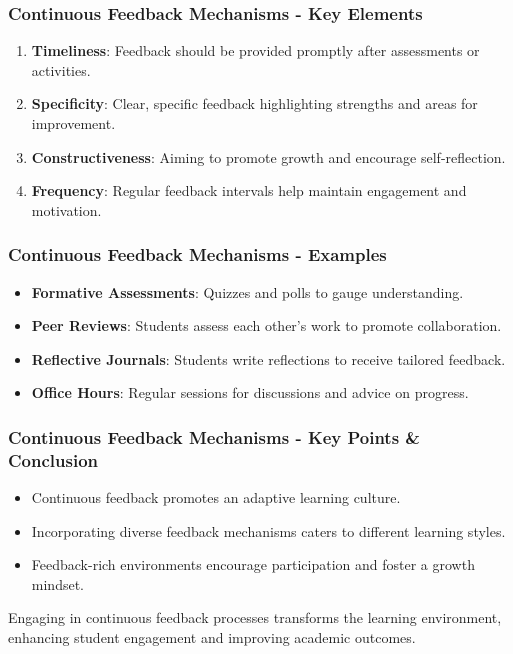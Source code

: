 \documentclass[aspectratio=169]{beamer}
\begin{document}
\begin{frame}[fragile]
    \frametitle{Continuous Feedback Mechanisms - Key Elements}
    \begin{enumerate}
        \item \textbf{Timeliness}: Feedback should be provided promptly after assessments or activities.
        \item \textbf{Specificity}: Clear, specific feedback highlighting strengths and areas for improvement.
        \item \textbf{Constructiveness}: Aiming to promote growth and encourage self-reflection.
        \item \textbf{Frequency}: Regular feedback intervals help maintain engagement and motivation.
    \end{enumerate}
\end{frame}

\begin{frame}[fragile]
    \frametitle{Continuous Feedback Mechanisms - Examples}
    \begin{itemize}
        \item \textbf{Formative Assessments}: Quizzes and polls to gauge understanding.
        \item \textbf{Peer Reviews}: Students assess each other's work to promote collaboration.
        \item \textbf{Reflective Journals}: Students write reflections to receive tailored feedback.
        \item \textbf{Office Hours}: Regular sessions for discussions and advice on progress.
    \end{itemize}
\end{frame}

\begin{frame}[fragile]
    \frametitle{Continuous Feedback Mechanisms - Key Points & Conclusion}
    \begin{itemize}
        \item Continuous feedback promotes an adaptive learning culture.
        \item Incorporating diverse feedback mechanisms caters to different learning styles.
        \item Feedback-rich environments encourage participation and foster a growth mindset.
    \end{itemize}

    Engaging in continuous feedback processes transforms the learning environment, enhancing student engagement and improving academic outcomes.
\end{frame}
\end{document}
